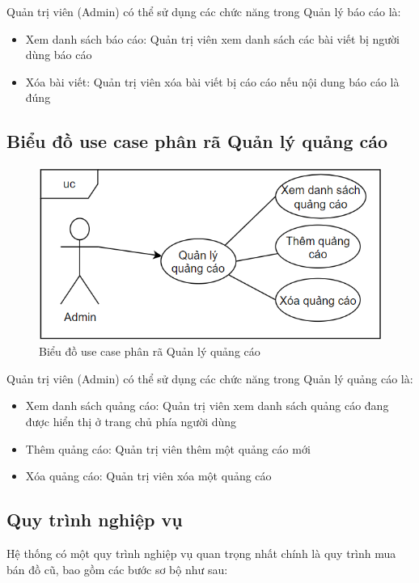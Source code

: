 \documentclass[../DoAn.tex]{subfiles}
\begin{document}
Quản trị viên (Admin) có thể sử dụng các chức năng trong Quản lý báo cáo là:

\begin{itemize}
\item Xem danh sách báo cáo: Quản trị viên xem danh sách các bài viết bị người dùng báo cáo
\item Xóa bài viết: Quản trị viên xóa bài viết bị cáo cáo nếu nội dung báo cáo là đúng
\end{itemize}

\subsection{Biểu đồ use case phân rã Quản lý quảng cáo}
\label{subsection:2.2.5}
\begin{figure}[H]
\includegraphics[width=0.75\linewidth]{Hinhve/adsManage.png}
\centering
\caption{Biểu đồ use case phân rã Quản lý quảng cáo}
\end{figure}

Quản trị viên (Admin) có thể sử dụng các chức năng trong Quản lý quảng cáo là:

\begin{itemize}
\item Xem danh sách quảng cáo: Quản trị viên xem danh sách quảng cáo đang được hiển thị ở trang chủ phía người dùng
\item Thêm quảng cáo: Quản trị viên thêm một quảng cáo mới
\item Xóa quảng cáo: Quản trị viên xóa một quảng cáo 
\end{itemize}
\subsection{Quy trình nghiệp vụ}
\label{subsection:2.2.3}
Hệ thống có một quy trình nghiệp vụ quan trọng nhất chính là quy trình mua bán đồ cũ, bao gồm các bước sơ bộ như sau:
\end{document}
